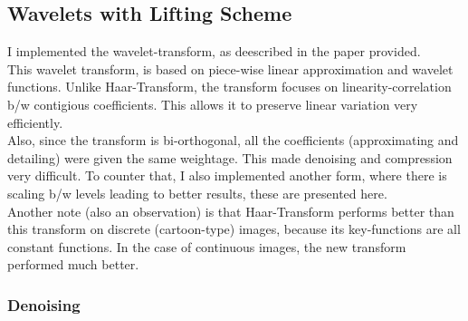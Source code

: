 \documentclass{article}
\begin{document}
\pagebreak
\subsection*{Wavelets with Lifting Scheme}
I implemented the wavelet-transform, as deescribed in the paper provided.\\
This wavelet transform, is based on piece-wise linear approximation and wavelet functions. Unlike Haar-Transform, the transform focuses on linearity-correlation b/w contigious coefficients. This allows it to preserve linear variation very efficiently.\\
Also, since the transform is bi-orthogonal, all the coefficients (approximating and detailing) were given the same weightage. This made denoising and compression very difficult. To counter that, I also implemented another form, where there is scaling b/w levels leading to better results, these are presented here.\\
Another note (also an observation) is that Haar-Transform performs better than this transform on discrete (cartoon-type) images, because its key-functions are all constant functions. In the case of continuous images, the new transform performed much better.\\
\subsubsection*{Denoising}
\end{document}
